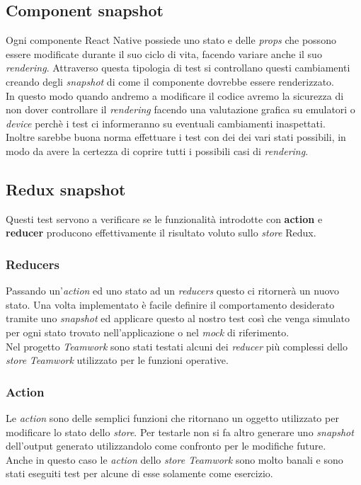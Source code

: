 \subsection{Component snapshot}
Ogni componente React Native possiede uno stato e delle \emph{props} che possono essere modificate durante il suo ciclo di vita, facendo variare anche il suo \emph{rendering}. Attraverso questa tipologia di test si controllano questi cambiamenti creando degli \emph{snapshot} di come il componente dovrebbe essere renderizzato. \\
In questo modo quando andremo a modificare il codice avremo la sicurezza di non dover controllare il \emph{rendering} facendo una valutazione grafica su emulatori o \emph{device} perchè i test ci informeranno su eventuali cambiamenti inaspettati. \\
Inoltre sarebbe buona norma effettuare i test con dei  dei vari stati possibili, in modo da avere la certezza di coprire tutti i possibili casi di \emph{rendering}.

\subsection{Redux snapshot}
Questi test servono a verificare se le funzionalità introdotte con \textbf{action} e \textbf{reducer} producono effettivamente il risultato voluto sullo \emph{store} Redux. \\
\subsubsection{Reducers}
Passando un'\emph{action} ed uno stato ad un \emph{reducers} questo ci ritornerà un nuovo stato. Una volta implementato è facile definire il comportamento desiderato tramite uno \emph{snapshot} ed applicare questo al nostro test così che venga simulato per ogni stato trovato nell'applicazione o nel \emph{mock} di riferimento. \\
Nel progetto \emph{Teamwork} sono stati testati alcuni dei \emph{reducer} più complessi dello \emph{store} \emph{Teamwork} utilizzato per le funzioni operative.\\

\subsubsection{Action}
Le \emph{action} sono delle semplici funzioni che ritornano un oggetto utilizzato per modificare lo stato dello \emph{store}. Per testarle non si fa altro generare uno \emph{snapshot} dell'output generato utilizzandolo come confronto per le modifiche future. \\
Anche in questo caso le \emph{action} dello \emph{store Teamwork} sono molto banali e sono stati eseguiti test per alcune di esse solamente come esercizio.

